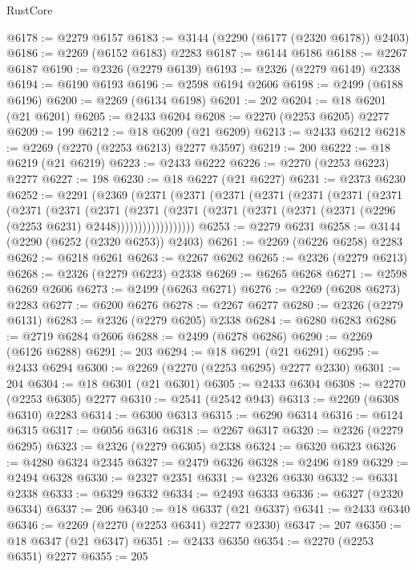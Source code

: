 \begin{lexlean}{RustCore}
\begin{coremodule}
@6178 := @2279 @6157
@6183 := @3144 (@2290 (@6177 (@2320 @6178)) @2403)
@6186 := @2269 (@6152 @6183) @2283
@6187 := @6144 @6186
@6188 := @2267 @6187
@6190 := @2326 (@2279 @6139)
@6193 := @2326 (@2279 @6149) @2338
@6194 := @6190 @6193
@6196 := @2598 @6194 @2606
@6198 := @2499 (@6188 @6196)
@6200 := @2269 (@6134 @6198)
@6201 := 202
@6204 := @18 @6201 (@21 @6201)
@6205 := @2433 @6204
@6208 := @2270 (@2253 @6205) @2277
@6209 := 199
@6212 := @18 @6209 (@21 @6209)
@6213 := @2433 @6212
@6218 := @2269 (@2270 (@2253 @6213) @2277 @3597)
@6219 := 200
@6222 := @18 @6219 (@21 @6219)
@6223 := @2433 @6222
@6226 := @2270 (@2253 @6223) @2277
@6227 := 198
@6230 := @18 @6227 (@21 @6227)
@6231 := @2373 @6230
@6252 := @2291
    (@2369
      (@2371
        (@2371
          (@2371
            (@2371
              (@2371
                (@2371
                  (@2371
                    (@2371
                      (@2371
                        (@2371
                          (@2371
                            (@2371
                              (@2371
                                (@2371 (@2371 (@2371 (@2296 (@2253 @6231) @2448))))))))))))))))))
@6253 := @2279 @6231
@6258 := @3144 (@2290 (@6252 (@2320 @6253)) @2403)
@6261 := @2269 (@6226 @6258) @2283
@6262 := @6218 @6261
@6263 := @2267 @6262
@6265 := @2326 (@2279 @6213)
@6268 := @2326 (@2279 @6223) @2338
@6269 := @6265 @6268
@6271 := @2598 @6269 @2606
@6273 := @2499 (@6263 @6271)
@6276 := @2269 (@6208 @6273) @2283
@6277 := @6200 @6276
@6278 := @2267 @6277
@6280 := @2326 (@2279 @6131)
@6283 := @2326 (@2279 @6205) @2338
@6284 := @6280 @6283
@6286 := @2719 @6284 @2606
@6288 := @2499 (@6278 @6286)
@6290 := @2269 (@6126 @6288)
@6291 := 203
@6294 := @18 @6291 (@21 @6291)
@6295 := @2433 @6294
@6300 := @2269 (@2270 (@2253 @6295) @2277 @2330)
@6301 := 204
@6304 := @18 @6301 (@21 @6301)
@6305 := @2433 @6304
@6308 := @2270 (@2253 @6305) @2277
@6310 := @2541 (@2542 @943)
@6313 := @2269 (@6308 @6310) @2283
@6314 := @6300 @6313
@6315 := @6290 @6314
@6316 := @6124 @6315
@6317 := @6056 @6316
@6318 := @2267 @6317
@6320 := @2326 (@2279 @6295)
@6323 := @2326 (@2279 @6305) @2338
@6324 := @6320 @6323
@6326 := @4280 @6324 @2345
@6327 := @2479 @6326
@6328 := @2496 @189
@6329 := @2494 @6328
@6330 := @2327 @2351
@6331 := @2326 @6330
@6332 := @6331 @2338
@6333 := @6329 @6332
@6334 := @2493 @6333
@6336 := @6327 (@2320 @6334)
@6337 := 206
@6340 := @18 @6337 (@21 @6337)
@6341 := @2433 @6340
@6346 := @2269 (@2270 (@2253 @6341) @2277 @2330)
@6347 := 207
@6350 := @18 @6347 (@21 @6347)
@6351 := @2433 @6350
@6354 := @2270 (@2253 @6351) @2277
@6355 := 205

\end{coremodule}
\end{lexlean}
